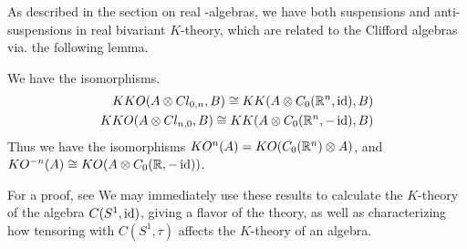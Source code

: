 As described in the section on real \Cstar-algebras, we have both suspensions and anti-suspensions in real bivariant $K$-theory, which are related to the Clifford algebras via. the following lemma. 
\begin{lemma}
	We have the isomorphisms.
	\begin{align*}
		KKO(A\otimes Cl_{0,n},B)\cong KK(A\otimes C_0(\mathbb{R}^n,\operatorname{id}),B) \\
		KKO(A\otimes Cl_{n,0},B)\cong KK(A\otimes C_0(\mathbb{R}^n,-\operatorname{id}),B)
	\end{align*}
	Thus we have the isomorphisms $KO^n(A)=KO(C_0(\mathbb{R}^n)\otimes A)$, and $KO^{-n}(A)\cong KO(A\otimes C_0(\mathbb{R},-\operatorname{id}))$. 
\end{lemma}
For a proof, see \cite{kasparov}
We may immediately use these results to calculate the $K$-theory of the algebra $C(S^1,\operatorname{id})$, giving a flavor of the theory, as well as characterizing how tensoring with $C(S^1,\tau)$ affects the $K$-theory of an algebra. 

